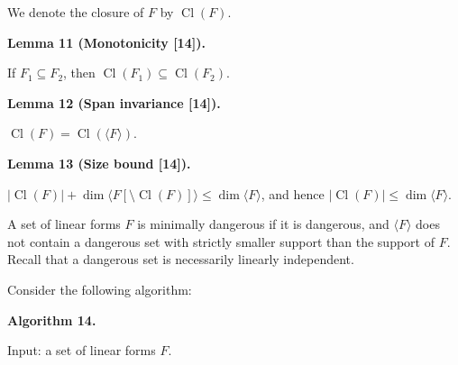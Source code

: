 We denote the closure of $F$ by $\mathop{\mathrm{Cl}}(F)$.\par



\par\medskip\noindent\textbf{
Lemma 11 (Monotonicity [14]).
}\par



If $F_{1}\subseteq F_{2}$, then $\mathop{\mathrm{Cl}}(F_{1})\subseteq\mathop{\mathrm{Cl}}(F_{2})$.\par




\par\medskip\noindent\textbf{
Lemma 12 (Span invariance [14]).
}\par



$\mathop{\mathrm{Cl}}(F)=\mathop{\mathrm{Cl}}(\langle F\rangle)$.\par




\par\medskip\noindent\textbf{
Lemma 13 (Size bound [14]).
}\par



$|\mathop{\mathrm{Cl}}(F)|+\dim\langle F[\setminus\mathop{\mathrm{Cl}}(F)]\rangle\leq\dim\langle F\rangle$, and hence
$|\mathop{\mathrm{Cl}}(F)|\leq\dim\langle F\rangle$.\par




A set of linear forms $F$ is minimally dangerous if it is dangerous, and $\langle F\rangle$ does not contain a dangerous set with strictly smaller support than the support of $F$. Recall that a dangerous set is necessarily linearly independent.\par



Consider the following algorithm:\par



\par\medskip\noindent\textbf{
Algorithm 14.
}\par



Input: a set of linear forms $F$.\par


